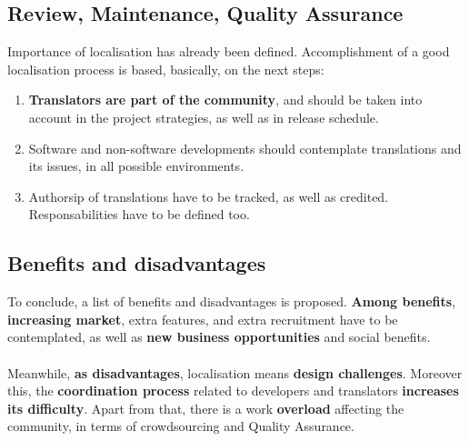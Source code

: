 \documentclass[11pt]{article}
\begin{document}
\subsection{Review, Maintenance, Quality Assurance}
Importance of localisation has already been defined. Accomplishment of a good localisation process is based, basically, on the next steps:
\begin{enumerate}
\item{\textbf{Translators are part of the community}, and should be taken into account in the project strategies, as well as in release schedule}.
\item{Software and non-software developments should contemplate translations and its issues, in all possible environments}.
\item{Authorsip of translations have to be tracked, as well as credited. Responsabilities have to be defined too}.
\end{enumerate}
\subsection{Benefits and disadvantages}
To conclude, a list of benefits and disadvantages is proposed. \textbf{Among benefits}, \textbf{increasing market}, extra features, and extra recruitment have to be contemplated, as well as \textbf{new business opportunities} and social benefits.\\
\\
Meanwhile, \textbf{as disadvantages}, localisation means \textbf{design challenges}. Moreover this, the \textbf{coordination process} related to developers and translators \textbf{increases its difficulty}. Apart from that, there is a work \textbf{overload} affecting the community, in terms of crowdsourcing and Quality Assurance.
\end{document}
